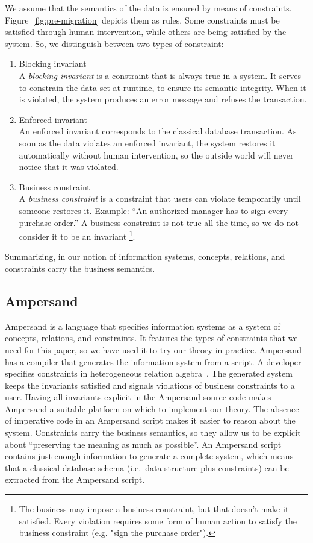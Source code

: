 \documentclass[runningheads]{llncs}
\def\define#1{\label{dfn:#1}{\em #1}\index{#1}}
\begin{document}
   We assume that the semantics of the data is ensured by means of constraints.
   Figure~\ref{fig:pre-migration} depicts them as rules.
   Some constraints must be satisfied through human intervention, while others are being satisfied by the system.
   So, we distinguish between two types of constraint:
\begin{enumerate}
\item Blocking invariant\\
   A \define{blocking invariant} is a constraint that is always true in a system.
   It serves to constrain the data set at runtime, to ensure its semantic integrity.
   When it is violated, the system produces an error message and refuses the transaction.
\item Enforced invariant\\
   An enforced invariant corresponds to the classical database transaction.
   As soon as the data violates an enforced invariant, the system restores it automatically without human intervention,
   so the outside world will never notice that it was violated.
\item Business constraint\\
   A \define{business constraint} is a constraint that users can violate temporarily until someone restores it.
   Example: ``An authorized manager has to sign every purchase order.''
   A business constraint is not true all the time, so we do not consider it to be an invariant%
\footnote{The business may impose a business constraint, but that doesn't make it satisfied.
   Every violation requires some form of human action to satisfy the business constraint (e.g. "sign the purchase order").}.
\end{enumerate}
   Summarizing, in our notion of information systems, concepts, relations, and constraints carry the business semantics.  

\subsection{Ampersand}
   Ampersand is a language that specifies information systems as a system of concepts, relations, and constraints.
   It features the types of constraints that we need for this paper, so we have used it to try our theory in practice.
   Ampersand has a compiler that generates the information system from a script.
   A developer specifies constraints in heterogeneous relation algebra~\cite{Hattensperger1999,Alloy2006}.
   The generated system keeps the invariants satisfied and signals violations of business constraints to a user.
   Having all invariants explicit in the Ampersand source code makes Ampersand a suitable platform on which to implement our theory.
   The absence of imperative code in an Ampersand script makes it easier to reason about the system.
   Constraints carry the business semantics, so they allow us to be explicit about ``preserving the meaning as much as possible''.
   An Ampersand script contains just enough information to generate a complete system,
   which means that a classical database schema (i.e.\ data structure plus constraints) can be extracted from the Ampersand script.
\end{document}
